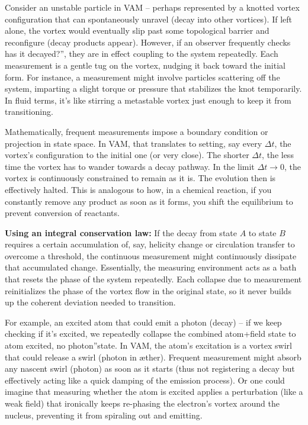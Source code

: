 \documentclass[a4paper, aps,preprint,superscriptaddress, 12pt]{revtex4}
\begin{document}
Consider an unstable particle in VAM – perhaps represented by a knotted vortex configuration that can spontaneously unravel (decay into other vortices). If left alone, the vortex would eventually slip past some topological barrier and reconfigure (decay products appear). However, if an observer frequently checks \grqq has it decayed?\textquotedblright, they are in effect coupling to the system repeatedly. Each measurement is a gentle tug on the vortex, nudging it back toward the initial form. For instance, a measurement might involve particles scattering off the system, imparting a slight torque or pressure that stabilizes the knot temporarily. In fluid terms, it's like stirring a metastable vortex just enough to keep it from transitioning.


Mathematically, frequent measurements impose a boundary condition or projection in state space. In VAM, that translates to setting, say every $\Delta t$, the vortex's configuration to the initial one (or very close). The shorter $\Delta t$, the less time the vortex has to wander towards a decay pathway. In the limit $\Delta t \to 0$, the vortex is continuously constrained to remain as it is. The evolution then is effectively halted. This is analogous to how, in a chemical reaction, if you constantly remove any product as soon as it forms, you shift the equilibrium to prevent conversion of reactants.


\textbf{Using an integral conservation law:} If the decay from state $A$ to state $B$ requires a certain accumulation of, say, helicity change or circulation transfer to overcome a threshold, the continuous measurement might continuously dissipate that accumulated change. Essentially, the measuring environment acts as a bath that resets the phase of the system repeatedly. Each collapse due to measurement reinitializes the phase of the vortex flow in the original state, so it never builds up the coherent deviation needed to transition.


For example, an excited atom that could emit a photon (decay) – if we keep checking if it's excited, we repeatedly collapse the combined atom+field state to \grqq atom excited, no photon\textquotedblright state. In VAM, the atom's excitation is a vortex swirl that could release a swirl (photon in æther). Frequent measurement might absorb any nascent swirl (photon) as soon as it starts (thus not registering a decay but effectively acting like a quick damping of the emission process). Or one could imagine that measuring whether the atom is excited applies a perturbation (like a weak field) that ironically keeps re-phasing the electron's vortex around the nucleus, preventing it from spiraling out and emitting.
\end{document}
